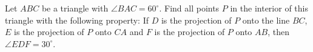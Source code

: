 Let $ABC$ be a triangle with $\angle BAC = 60^\circ$. Find all points $P$ in the interior of
this triangle with the following property:
If $D$ is the projection of $P$ onto the line $BC$, $E$ is the projection of $P$ onto
$CA$ and $F$ is the projection of $P$ onto $AB$, then $\angle EDF = 30^\circ$.